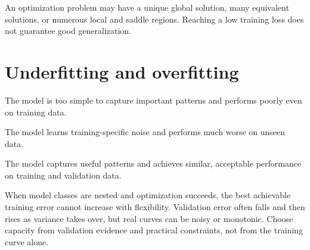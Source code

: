 An optimization problem may have a unique global solution, many equivalent solutions, or numerous local and saddle regions. Reaching a low training loss does not guarantee good generalization.

\section{Underfitting and overfitting}

\begin{description}[leftmargin=1.15in,style=nextline]
  \item[Underfitting] The model is too simple to capture important patterns and performs poorly even on training data.
  \item[Overfitting] The model learns training-specific noise and performs much worse on unseen data.
  \item[Good fit] The model captures useful patterns and achieves similar, acceptable performance on training and validation data.
\end{description}

\begin{mlfigure}
\end{mlfigure}

\begin{intuition}
When model classes are nested and optimization succeeds, the best achievable training error cannot increase with flexibility. Validation error often falls and then rises as variance takes over, but real curves can be noisy or monotonic. Choose capacity from validation evidence and practical constraints, not from the training curve alone.
\end{intuition}

